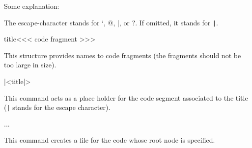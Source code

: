 Some explanation:

\begin{texsource}

\end{texsource}

The escape-character stands for `, @, |, or ?. If omitted, it stands for \verb'|'. 

\begin{texsource}
\<title\><<<
code fragment
>>>

\end{texsource}

This structure provides names to code fragments (the fragments should not be too large in size).


\begin{texsource}
 |<title|>
 \end{texsource}

 This command acts as a place holder for the code segment associated to the title (\texttt{|} stands for the escape character). 

\begin{texsource}
   \OutputCode\<...\>
 \end{texsource}

This command creates a file for the code whose root node is specified.



